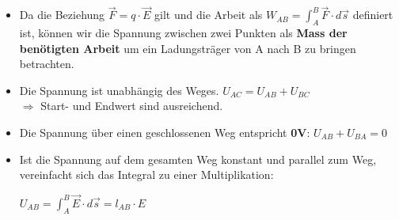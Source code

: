 \begin{itemize}

	\item	Da die Beziehung $\vec{F} =  q \cdot \vec{E} $ gilt und die Arbeit als $ W_{AB} = \int_A^B \vec{F} \cdot d\vec{s}$ definiert ist, können wir die Spannung zwischen zwei Punkten als \textbf{Mass der benötigten Arbeit} um ein Ladungsträger von A nach B zu bringen betrachten.  \\
	\item Die Spannung ist unabhängig des Weges.  $U_{AC} = U_{AB} + U_{BC}$
	      \\ $\Rightarrow$ Start- und Endwert sind ausreichend. \\
	\item Die Spannung über einen geschlossenen Weg entspricht \textbf{0V}: $U_{AB} + U_{BA} = 0$ \\
	\item Ist die Spannung auf dem gesamten Weg konstant und parallel zum Weg, vereinfacht sich das Integral zu einer Multiplikation: \\
	      \begin{center}
	      	$ U_{AB} = \int_{A}^{B} \vec{E}\cdot d\vec{s} = l_{AB} \cdot E$
	      \end{center}
\end{itemize}


\newpage
